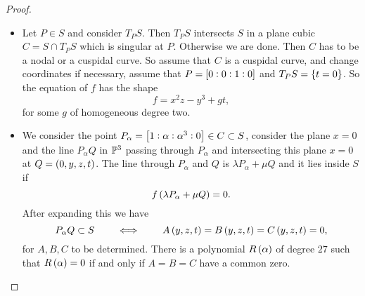 \begin{proof}
\hfill
\begin{itemize}
\item Let $ P \in S $ and consider $ T_PS $. Then $ T_PS $ intersects $ S $ in a plane cubic $ C = S \cap T_PS $ which is singular at $ P $. Otherwise we are done. Then $ C $ has to be a nodal or a cuspidal curve. So assume that $ C $ is a cuspidal curve, and change coordinates if necessary, assume that $ P = \sbr{0 : 0 : 1 : 0} $ and $ T_PS = \cbr{t = 0} $. So the equation of $ f $ has the shape
$$ f = x^2z - y^3 + gt, $$
for some $ g $ of homogeneous degree two.
\item We consider the point $ P_\alpha = \sbr{1 : \alpha : \alpha^3 : 0} \in C \subset S $, consider the plane $ x = 0 $ and the line $ P_\alpha Q $ in $ \P^3 $ passing through $ P_\alpha $ and intersecting this plane $ x = 0 $ at $ Q = \br{0, y, z, t} $. The line through $ P_\alpha $ and $ Q $ is $ \lambda P_\alpha + \mu Q $ and it lies inside $ S $ if
$$ f\br{\lambda P_\alpha + \mu Q} = 0. $$
After expanding this we have
$$ P_\alpha Q \subset S \qquad \iff \qquad A\br{y, z, t} = B\br{y, z, t} = C\br{y, z, t} = 0, $$
for $ A, B, C $ to be determined. There is a polynomial $ R\br{\alpha} $ of degree $ 27 $ such that $ R\br{\alpha} = 0 $ if and only if $ A = B = C $ have a common zero.

\pagebreak



\end{itemize}
\end{proof}
